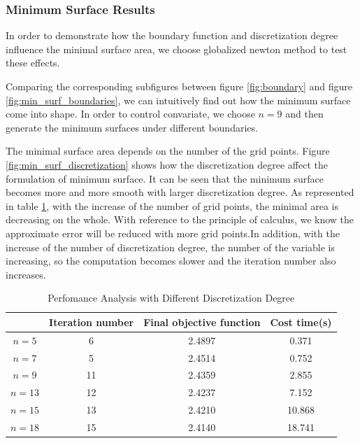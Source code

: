 \subsubsection{Minimum Surface Results}
In order to demonstrate how the boundary function and discretization degree influence the minimal surface area, we choose globalized newton method to test these effects.

Comparing the corresponding subfigures between figure \ref{fig:boundary} and figure \ref{fig:min_surf_boundaries}, we can intuitively find out how the minimum surface come into shape. In order to control convariate, we choose $n=9$ and then generate the minimum surfaces under different boundaries. 

The minimal surface area depends on the number of the grid points. Figure \ref{fig:min_surf_discretization} shows how the discretization degree affect the formulation of minimum surface. It can be seen that the minimum surface becomes more and more smooth with larger discretization degree. As represented in table \ref{tab:per_vs_dis}, with the increase of the number of grid points, the minimal area is decreasing on the whole. With reference to the principle of calculus, we know the approximate error will be reduced with more grid points.In addition, with the increase of the number of discretization degree, the number of the variable is increasing, so the computation becomes slower and the iteration number also increases. 



\begin{table}[!ht]
    \caption{Perfomance Analysis with Different Discretization Degree}\label{tab:per_vs_dis}
    \begin{tabular*}{\hsize}{@{}@{\extracolsep{\fill}}cccc@{}}
    \toprule
             &Iteration number  &Final objective function  &Cost time(s)  \\
    \midrule
    $n=5$   &6   &2.4897  &0.371  \\
    $n=7$   &5   &2.4514  &0.752  \\
    $n=9$   &11  &2.4359  &2.855  \\
    $n=13$  &12  &2.4237  &7.152  \\
    $n=15$  &13  &2.4210  &10.868 \\
    $n=18$  &15  &2.4140  &18.741 \\
    \bottomrule
    \end{tabular*}
\end{table}

